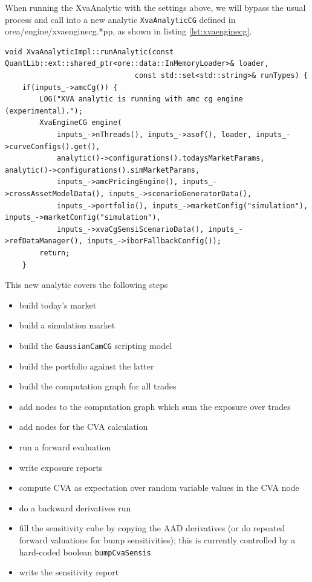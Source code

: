 When running the XvaAnalytic with the settings above, we will bypass the usual process
and call into a new analytic {\tt XvaAnalyticCG} defined in orea/engine/xvaenginecg.*pp,
as shown in listing \ref{lst:xvaenginecg}.

\begin{listing}[hbt]
\begin{verbatim}
void XvaAnalyticImpl::runAnalytic(const QuantLib::ext::shared_ptr<ore::data::InMemoryLoader>& loader,
                              const std::set<std::string>& runTypes) {
    if(inputs_->amcCg()) {
        LOG("XVA analytic is running with amc cg engine (experimental).");
        XvaEngineCG engine(
            inputs_->nThreads(), inputs_->asof(), loader, inputs_->curveConfigs().get(),
            analytic()->configurations().todaysMarketParams, analytic()->configurations().simMarketParams,
            inputs_->amcPricingEngine(), inputs_->crossAssetModelData(), inputs_->scenarioGeneratorData(),
            inputs_->portfolio(), inputs_->marketConfig("simulation"), inputs_->marketConfig("simulation"),
            inputs_->xvaCgSensiScenarioData(), inputs_->refDataManager(), inputs_->iborFallbackConfig());
        return;
    }
\end{verbatim}
\caption{Call into the experimental XVA AAD-Sensitivity implementation, bypassing the ususal XVA run.}
\label{lst:xvaenginecg}
\end{listing}

This new analytic covers the following steps
\begin{itemize}
\item build today's market
\item build a simulation market
\item build the {\tt GaussianCamCG} scripting model
\item build the portfolio against the latter
\item build the computation graph for all trades
\item add nodes to the computation graph which sum the exposure over trades
\item add nodes for the CVA calculation
\item run a forward evaluation
\item write exposure reports
\item compute CVA as expectation over random variable values in the CVA node
\item do a backward derivatives run
\item fill the sensitivity cube by copying the AAD derivatives (or do repeated forward valuations for bump sensitivities);
  this is currently controlled by a hard-coded boolean {\tt bumpCvaSensis}
\item write the sensitivity report
\end{itemize}

